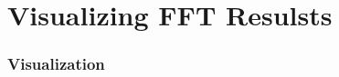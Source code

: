 \section{Visualizing FFT Resulsts}
\begin{frame}
  \frametitle{Visualization}


 
\end{frame}




 
